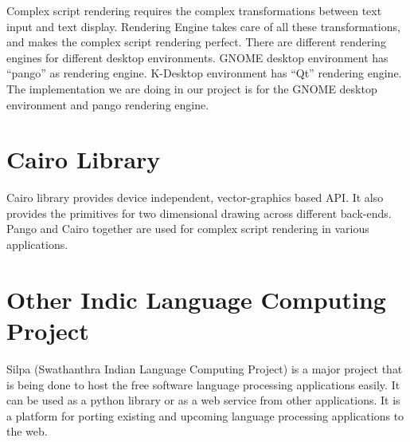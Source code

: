 Complex script rendering requires the complex transformations between text input and text display. Rendering Engine takes care of all these transformations, and makes the complex script rendering perfect. There are different rendering engines for different desktop environments. GNOME desktop environment has ``pango'' \cite{internet4} \cite{internet3} as rendering engine. K-Desktop environment \cite{internet5} has ``Qt'' \cite{wiki6} rendering engine. The implementation we are doing in our project is for the GNOME desktop environment and pango rendering engine. 

\section{Cairo Library}
Cairo library\cite{internet6} provides device independent, vector-graphics based API. It also provides the primitives for two dimensional drawing across different back-ends. Pango and Cairo \cite{internet7} together are used for complex script rendering in various applications.

\section{Other Indic Language Computing Project}
Silpa (Swathanthra Indian Language Computing Project) \cite{internet8} is a major project that is being done to host the free software language processing applications easily. It can be used as a python library or as a web service from other applications. It is a platform for porting existing and upcoming language processing applications to the web.



